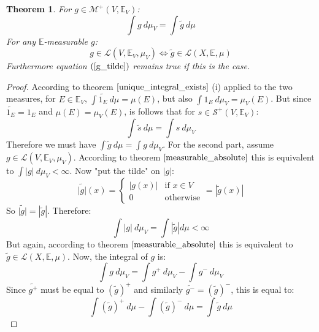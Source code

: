\documentclass[12pt, a4paper]{article}
\newtheorem{theorem}{Theorem}[section]
\numberwithin{equation}{section}
\begin{document}
\begin{theorem}
For $g\in\mathcal{M}^+(V,\mathbb{E}_V)$:
\begin{equation}
\label{g_tilde}
\int g\ d\mu_V=\int\tilde{g}\ d\mu
\end{equation}
For any $\mathbb{E}$-measurable $g$:
\begin{equation}
g\in\mathcal{L}(V,\mathbb{E}_V,\mu_V)\Leftrightarrow \tilde{g}\in\mathcal{L}(X,\mathbb{E},\mu)
\end{equation}
Furthermore equation $(\ref{g_tilde})$ remains true if this is the case.
\end{theorem}
\begin{proof}
According to theorem $\ref{unique_integral_exists}$ (i) applied to the two measures, for $E\in\mathbb{E}_V$, $\int \widetilde{1_E}\ d\mu=\mu(E)$, but also $\int 1_E\ d\mu_V=\mu_V(E)$. But since $\widetilde{1_E}=1_E$ and $\mu(E)=\mu_V(E)$, is follows that for $s\in\mathcal{S}^+(V,\mathbb{E}_V)$:
\begin{equation}
\int \tilde{s}\ d\mu=\int s\ d\mu_V
\end{equation}
Therefore we must have $\int\tilde{g}\ d\mu=\int g\ d\mu_V$.
For the second part, assume $g\in\mathcal{L}(V,\mathbb{E}_V,\mu_V)$. According to theorem $\ref{measurable_absolute}$ this is equivalent to $\int|g|\ d\mu_V<\infty$. Now "put the tilde" on $|g|$:
\begin{equation}
\widetilde{|g|}(x)=
\begin{cases}
|g(x)|	& \textrm{if }x\in V \\
0		& \textrm{otherwise}
\end{cases}
=|\tilde{g}(x)|
\end{equation}
So $\widetilde{|g|}=|\tilde{g}|$. Therefore:
\begin{equation}
\int|g|\ d\mu_V=\int |\tilde{g}|d\mu<\infty
\end{equation}
But again, according to theorem $\ref{measurable_absolute}$ this is equivalent to $\tilde{g}\in\mathcal{L}(X,\mathbb{E},\mu)$. Now, the integral of $g$ is:
\begin{equation}
\int g\ d\mu_V=\int g^+\ d\mu_V-\int g^-\ d\mu_V
\end{equation}
Since $\widetilde{g^+}$ must be equal to $(\tilde{g})^+$ and similarly $\widetilde{g^-}=(\tilde{g})^-$, this is equal to:
\begin{equation}
\int(\tilde{g})^+\ d\mu-\int(\tilde{g})^-\ d\mu=\int\tilde{g}\ d\mu
\end{equation}
\end{proof}
\end{document}
